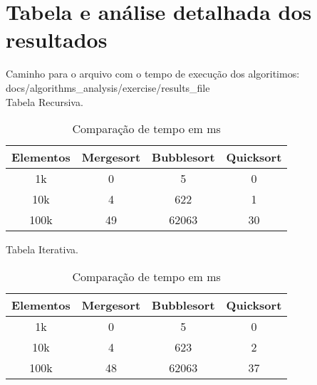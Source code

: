 \section{Tabela e análise detalhada dos resultados}
Caminho para o arquivo com o tempo de execução dos algoritimos: docs/algorithms_analysis/exercise/results_file \\

Tabela Recursiva. \\

\begin{table}[ht!]
    \centering
    \begin{tabular}{|c|c|c|c|}
    \hline
    \textbf{Elementos} &\textbf{Mergesort} & \textbf{Bubblesort} & \textbf{Quicksort} \\ \hline
     1k & 0 & 5 & 0  \\ \hline
     10k & 4 & 622 & 1  \\ \hline
     100k & 49 & 62063 & 30  \\ \hline
    \end{tabular}  
    \caption{Comparação de tempo em ms}
\end{table}

Tabela Iterativa. \\

\begin{table}[ht!]
    \centering
    \begin{tabular}{|c|c|c|c|}
    \hline
    \textbf{Elementos} &\textbf{Mergesort} & \textbf{Bubblesort} & \textbf{Quicksort} \\ \hline
     1k & 0 & 5 & 0  \\ \hline
     10k & 4 & 623 & 2  \\ \hline
     100k & 48 & 62063 & 37  \\ \hline
    \end{tabular}  
    \caption{Comparação de tempo em ms}
\end{table}



